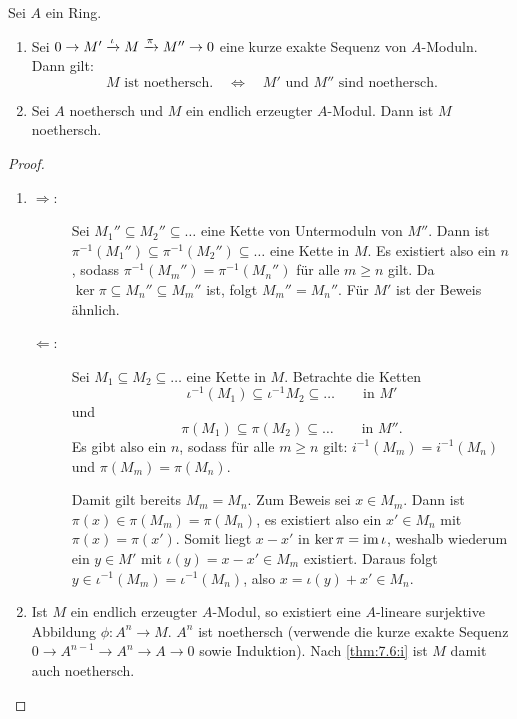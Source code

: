 \documentclass[12pt,a4paper]{scrartcl}
\theoremstyle{cplain}
\theoremstyle{cdef}
\begin{document}

\begin{satz} \label{thm:7.6}
	Sei $A$ ein Ring.
	\begin{enumerate}
		\item \label{thm:7.6:i} Sei $0\to M'\xrightarrow{\iota} M\xrightarrow{\pi} M''\to 0$ eine kurze exakte Sequenz von $A$-Moduln. Dann gilt:
		\[\text{$M$ ist noethersch.} \quad \Longleftrightarrow\quad \text{$M'$ und $M''$ sind noethersch.}\]
		\item Sei $A$ noethersch und $M$ ein endlich erzeugter $A$-Modul. Dann ist $M$ noethersch.\label{thm:7.6:ii}
	\end{enumerate}
\end{satz}
\begin{proof}
	\leavevmode
	\begin{enumerate}[label=\ref{thm:7.6:\roman*}]
		\item \begin{description}
			\item[\glqq$\Rightarrow$\grqq:] Sei $M_1''\subseteq M_2''\subseteq \dots$ eine Kette von Untermoduln von $M''$. Dann ist $\pi^{-1}(M_1'')\subseteq \pi^{-1}(M_2'')\subseteq \dots$ eine Kette in $M$. Es existiert also ein $n$, sodass $\pi^{-1}(M_m'') = \pi^{-1}(M_n'')$ für alle $m\ge n$ gilt. Da $\ker\pi\subseteq M_n''\subseteq M_m''$ ist, folgt $M_m'' = M_n''$. Für $M'$ ist der Beweis ähnlich.
			\item[\glqq$\Leftarrow$\grqq:] Sei $M_1\subseteq M_2\subseteq\dots$ eine Kette in $M$. Betrachte die Ketten
			\[\iota^{-1}(M_1)\subseteq \iota^{-1}M_2\subseteq\dots\qquad \text{in }M'\]
			und
			\[\pi(M_1)\subseteq \pi(M_2)\subseteq \dots \qquad \text{in }M''.\]
			Es gibt also ein $n$, sodass für alle $m\ge n$ gilt: $i^{-1}(M_m) = i^{-1}(M_n)$ und $\pi(M_m) = \pi(M_n)$.
			
			Damit gilt bereits $M_m = M_n$. Zum Beweis sei $x\in M_m$. Dann ist $\pi(x) \in \pi(M_m) = \pi(M_n)$, es existiert also ein $x'\in M_n$ mit $\pi(x) = \pi(x')$. Somit liegt $x-x'$ in $\operatorname{ker} \pi = \operatorname{im}  \iota$, weshalb wiederum ein $y \in M'$ mit $\iota(y) = x-x'\in M_m$ existiert. Daraus folgt $y\in \iota^{-1}(M_m) = \iota^{-1}(M_n)$, also $x = \iota(y) +x' \in M_n$.
		\end{description}
		\item Ist $M$ ein endlich erzeugter $A$-Modul, so existiert eine $A$-lineare surjektive Abbildung $\phi\colon A^n\to M$. $A^n$ ist noethersch (verwende die kurze exakte Sequenz $0\to A^{n-1}\to A^n\to A \to 0$ sowie Induktion). Nach \ref{thm:7.6:i} ist $M$ damit auch noethersch.
		\qedhere
	\end{enumerate}
\end{proof}
\end{document}
